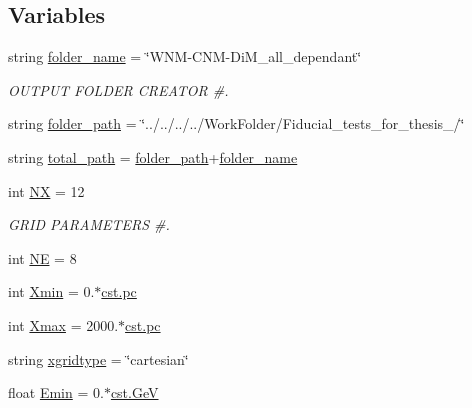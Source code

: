 \subsection*{Variables}
\begin{DoxyCompactItemize}
\item 
string \hyperlink{namespacenamelist__uniform_a7e0c8639f67e462bf0f0ba9874d6965b}{folder\+\_\+name} = \char`\"{}W\+NM-\/C\+NM-\/Di\+M\+\_\+all\+\_\+dependant\char`\"{}
\begin{DoxyCompactList}\small\item\em O\+U\+T\+P\+UT F\+O\+L\+D\+ER C\+R\+E\+A\+T\+OR \#. \end{DoxyCompactList}\item 
string \hyperlink{namespacenamelist__uniform_af7194a37a135451faa53df07d5d52c38}{folder\+\_\+path} = \char`\"{}../../../../Work\+Folder/Fiducial\+\_\+tests\+\_\+for\+\_\+thesis\+\_/\char`\"{}
\item 
string \hyperlink{namespacenamelist__uniform_a2e5ca55a46dfdae14714d691ada366aa}{total\+\_\+path} = \hyperlink{namespacenamelist__uniform_af7194a37a135451faa53df07d5d52c38}{folder\+\_\+path}+\hyperlink{namespacenamelist__uniform_a7e0c8639f67e462bf0f0ba9874d6965b}{folder\+\_\+name}
\item 
int \hyperlink{namespacenamelist__uniform_acac19d7f367bfd5436353d2252c045cc}{NX} = 12
\begin{DoxyCompactList}\small\item\em G\+R\+ID P\+A\+R\+A\+M\+E\+T\+E\+RS \#. \end{DoxyCompactList}\item 
int \hyperlink{namespacenamelist__uniform_a9a7501e0271bf9c456a9be1b666c1018}{NE} = 8
\item 
int \hyperlink{namespacenamelist__uniform_a7c7288ff312320da0dc2935e7c21279b}{Xmin} = 0.$\ast$\hyperlink{constants_8h_a2884cd030c4c825754349a525a1d06ce}{cst.\+pc}
\item 
int \hyperlink{namespacenamelist__uniform_a5a929208e654614b50cd847076017faf}{Xmax} = 2000.$\ast$\hyperlink{constants_8h_a2884cd030c4c825754349a525a1d06ce}{cst.\+pc}
\item 
string \hyperlink{namespacenamelist__uniform_a1bc8692763d4f8bb07a80e0724b8add8}{xgridtype} = \char`\"{}cartesian\char`\"{}
\item 
float \hyperlink{namespacenamelist__uniform_a32b39233fb12d5ffbaa3a950a1286f88}{Emin} = 0.$\ast$\hyperlink{constants_8h_aec0e126d9991db8ad0b26139f5860568}{cst.\+GeV}
\item 

\end{DoxyCompactItemize}
